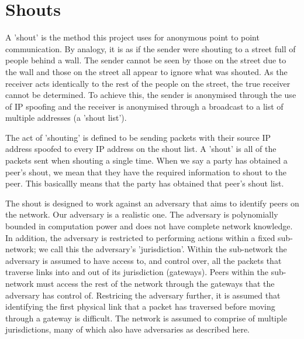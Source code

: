 \documentclass[ %
                    author={Luke Murray},
                supervisor={Dr. Simon Hollis},
                     title={Shadow Peer-to-Peer Networks},
                  subtitle={},
                    degree={MEng},
                      year={2013} ]{thesis}
\begin{document}

\section{Shouts}

A 'shout' is the method this project uses for anonymous point to point communication. By analogy, it is as if the sender were shouting to a street full of people behind a wall. The sender cannot be seen by those on the street due to the wall and those on the street all appear to ignore what was shouted. As the receiver acts identically to the rest of the people on the street, the true receiver cannot be determined. To achieve this, the sender is anonymised through the use of IP spoofing and the receiver is anonymised through a broadcast to a list of multiple addresses (a 'shout list').

The act of 'shouting' is defined to be sending packets with their source IP address spoofed to every IP address on the shout list. A 'shout' is all of the packets sent when shouting a single time. When we say a party has obtained a peer's shout, we mean that they have the required information to shout to the peer. This basicallly means that the party has obtained that peer's shout list.

The shout is designed to work against an adversary that aims to identify peers on the network. Our adversary is a realistic one. The adversary is polynomially bounded in computation power and does not have complete network knowledge. In addition, the adversary is restricted to performing actions within a fixed sub-network; we call this the adversary's 'jurisdiction'. Within the sub-network the adversary is assumed to have access to, and control over, all the packets that traverse links into and out of its jurisdiction (gateways). Peers within the sub-network must access the rest of the network through the gateways that the adversary has control of. Restricing the adversary further, it is assumed that identifying the first physical link that a packet has traversed before moving through a gateway is difficult. The network is assumed to comprise of multiple jurisdictions, many of which also have adversaries as described here.
\end{document}
